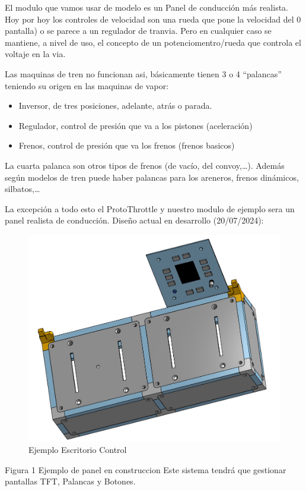 El modulo que vamos usar de modelo es un Panel de conducción más realista. Hoy por hoy los controles de velocidad
son una rueda que pone la velocidad del 0%
pantalla) o se parece a un regulador de tranvia. Pero en cualquier caso se mantiene, a nivel de uso, el concepto
de un potenciomentro/rueda que controla el voltaje en la via.

Las maquinas de tren no funcionan asi, básicamente tienen 3 o 4 “palancas” teniendo su origen en las maquinas de
vapor:
\begin{itemize}
    \item Inversor, de tres posiciones, adelante, atrás o parada.
    \item Regulador, control de presión que va a los pistones (aceleración)
    \item Frenos, control de presión que va los frenos (frenos basicos)
\end{itemize}
La cuarta palanca son otros tipos de frenos (de vacío, del convoy,…). Además según modelos de tren puede haber palancas para los areneros, frenos dinámicos, silbatos,…

La excepción a todo esto el ProtoThrottle y nuestro modulo de ejemplo sera un panel realista de conducción. Diseño actual en desarrollo (20/07/2024):

\begin{figure}[H]
    \centering
    \includegraphics[scale=0.4]{images/EjemploEscritorio.jpeg}
    \caption{Ejemplo Escritorio Control}
    \label{fig:driverDeskExample}
\end{figure}
Figura 1 Ejemplo de panel en construccion
Este sistema tendrá que gestionar pantallas TFT, Palancas y Botones.

